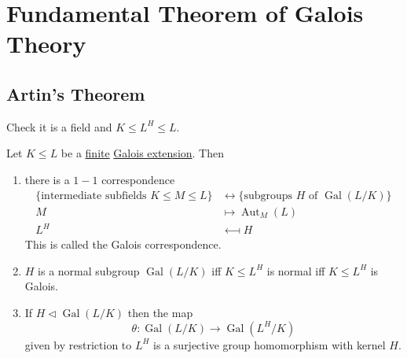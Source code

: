 \documentclass{article}
\DeclareMathOperator{\Aut}{Aut}
\DeclareMathOperator{\Gal}{Gal}
\begin{document}
\clearpage
\section{Fundamental Theorem of Galois Theory}
\subsection{Artin's Theorem}

\begin{ex}
    Check it is a field and $K \leq L^H \leq L$.
\end{ex}

\begin{nthm}\label{thm:3.2}
    Let $K \leq L$ be a \hyperlink{def:degreeOfFieldExt}{finite} \hyperlink{def:galoisExt}{Galois extension}.
    Then
    \begin{enumerate}[label=(\roman*)]
        \item there is a $1-1$ correspondence
            \begin{align*}
                \{\text{intermediate subfields } K \leq M \leq L\} &\longleftrightarrow \{\text{subgroups $H$ of } \Gal(L/K)\} \\
                M &\longmapsto \Aut_M(L) \\
                L^H &\longmapsfrom H
            \end{align*}
            This is called the Galois correspondence.
        \item $H$ is a normal subgroup $\Gal(L/K)$ iff $K \leq L^H$ is normal iff $K \leq L^H$ is Galois.
        \item If $H \lhd \Gal(L/K)$ then the map
            \begin{equation*}
                \theta: \Gal(L/K) \longrightarrow \Gal(L^H/K)
            \end{equation*}
            given by restriction to $L^H$ is a surjective group homomorphism with kernel $H$.
    \end{enumerate}
\end{nthm}
\end{document}
